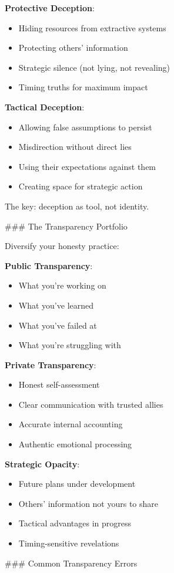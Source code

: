 \documentclass[12pt]{book}
\begin{document}
\textbf{Protective Deception}:
\begin{itemize}
\item Hiding resources from extractive systems
\item Protecting others' information
\item Strategic silence (not lying, not revealing)
\item Timing truths for maximum impact

\end{itemize}
\textbf{Tactical Deception}:
\begin{itemize}
\item Allowing false assumptions to persist
\item Misdirection without direct lies
\item Using their expectations against them
\item Creating space for strategic action

\end{itemize}
The key: deception as tool, not identity.

\#\#\# The Transparency Portfolio

Diversify your honesty practice:

\textbf{Public Transparency}:
\begin{itemize}
\item What you're working on
\item What you've learned
\item What you've failed at
\item What you're struggling with

\end{itemize}
\textbf{Private Transparency}:
\begin{itemize}
\item Honest self-assessment
\item Clear communication with trusted allies
\item Accurate internal accounting
\item Authentic emotional processing

\end{itemize}
\textbf{Strategic Opacity}:
\begin{itemize}
\item Future plans under development
\item Others' information not yours to share
\item Tactical advantages in progress
\item Timing-sensitive revelations

\end{itemize}
\#\#\# Common Transparency Errors
\end{document}
